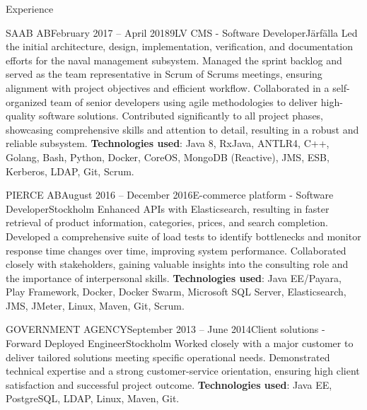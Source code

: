 \documentclass{resume}
\begin{document}
\begin{rSection}{Experience}
    \begin{rSubsection}{SAAB AB}{February 2017 -- April 2018}{9LV CMS - Software Developer}{Järfälla}
      \bItem Led the initial architecture, design, implementation, verification, and documentation efforts for the naval management subsystem.
      \bItem Managed the sprint backlog and served as the team representative in Scrum of Scrums meetings, ensuring alignment with project objectives and efficient workflow.
      \bItem Collaborated in a self-organized team of senior developers using agile methodologies to deliver high-quality software solutions.
      \bItem Contributed significantly to all project phases, showcasing comprehensive skills and attention to detail, resulting in a robust and reliable subsystem.
      \bItem \textbf{Technologies used}: Java 8, RxJava, ANTLR4, C++, Golang, Bash, Python, Docker, CoreOS, MongoDB (Reactive), JMS, ESB, Kerberos, LDAP, Git, Scrum.
    \end{rSubsection}

    \begin{rSubsection}{PIERCE AB}{August 2016 -- December 2016}{E-commerce platform - Software Developer}{Stockholm}
      \bItem Enhanced APIs with Elasticsearch, resulting in faster retrieval of product information, categories, prices, and search completion.
      \bItem Developed a comprehensive suite of load tests to identify bottlenecks and monitor response time changes over time, improving system performance.
      \bItem Collaborated closely with stakeholders, gaining valuable insights into the consulting role and the importance of interpersonal skills.
      \bItem \textbf{Technologies used}: Java EE/Payara, Play Framework, Docker, Docker Swarm, Microsoft SQL Server, Elasticsearch, JMS, JMeter, Linux, Maven, Git, Scrum.
    \end{rSubsection}

    \begin{rSubsection}{GOVERNMENT AGENCY}{September 2013 -- June 2014}{Client solutions - Forward Deployed Engineer}{Stockholm} %
      \bItem Worked closely with a major customer to deliver tailored solutions meeting specific operational needs.
      \bItem Demonstrated technical expertise and a strong customer-service orientation, ensuring high client satisfaction and successful project outcome.
      \bItem \textbf{Technologies used}: Java EE, PostgreSQL, LDAP, Linux, Maven, Git.
    \end{rSubsection}


\end{rSection}
\end{document}
